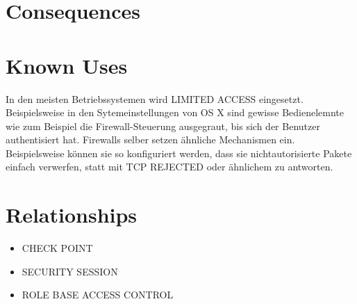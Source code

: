 \section{Consequences}
\begin{itemize}
\end{itemize}

\section{Known Uses}
In den meisten Betriebssystemen wird LIMITED ACCESS eingesetzt. Beispielsweise in den Sytemeinstellungen von OS X sind gewisse Bedienelemnte wie zum Beispiel die Firewall-Steuerung ausgegraut, bis sich der Benutzer authentisiert hat.
Firewalls selber setzen ähnliche Mechanismen ein. Beispielsweise können sie so konfiguriert werden, dass sie nichtautorisierte Pakete einfach verwerfen, statt mit TCP REJECTED oder ähnlichem zu antworten.

\section{Relationships}
\begin{itemize}
  \item CHECK POINT
  \item SECURITY SESSION
  \item ROLE BASE ACCESS CONTROL
\end{itemize}


